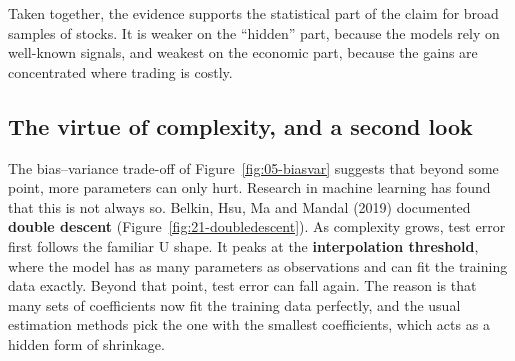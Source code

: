 Taken together, the evidence supports the statistical part of the claim for broad samples of stocks. It is weaker on the ``hidden'' part, because the models rely on well-known signals, and weakest on the economic part, because the gains are concentrated where trading is costly.

\subsection{The virtue of complexity, and a second look}
\label{sec:21-complexity}

The bias--variance trade-off of Figure~\ref{fig:05-biasvar} suggests that beyond some point, more parameters can only hurt. Research in machine learning has found that this is not always so. Belkin, Hsu, Ma and Mandal (2019) documented \textbf{double descent} (Figure~\ref{fig:21-doubledescent}). As complexity grows, test error first follows the familiar U shape. It peaks at the \textbf{interpolation threshold}, where the model has as many parameters as observations and can fit the training data exactly. Beyond that point, test error can fall again. The reason is that many sets of coefficients now fit the training data perfectly, and the usual estimation methods pick the one with the smallest coefficients, which acts as a hidden form of shrinkage.


